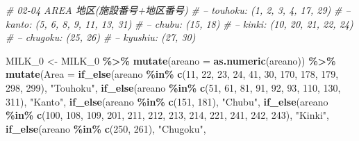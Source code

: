 \documentclass[
]{article}
\newenvironment{Shaded}{\begin{snugshade}}{\end{snugshade}}
\newcommand{\CommentTok}[1]{\textcolor[rgb]{0.56,0.35,0.01}{\textit{#1}}}
\newcommand{\DataTypeTok}[1]{\textcolor[rgb]{0.13,0.29,0.53}{#1}}
\newcommand{\DecValTok}[1]{\textcolor[rgb]{0.00,0.00,0.81}{#1}}
\newcommand{\KeywordTok}[1]{\textcolor[rgb]{0.13,0.29,0.53}{\textbf{#1}}}
\newcommand{\NormalTok}[1]{#1}
\newcommand{\OperatorTok}[1]{\textcolor[rgb]{0.81,0.36,0.00}{\textbf{#1}}}
\newcommand{\StringTok}[1]{\textcolor[rgb]{0.31,0.60,0.02}{#1}}
\begin{document}
\begin{Shaded}
\begin{Highlighting}[]
\CommentTok{\# 02{-}04 AREA 地区(施設番号+地区番号)}
\CommentTok{\# – touhoku: (1, 2, 3, 4, 17, 29)}
\CommentTok{\# – kanto: (5, 6, 8, 9, 11, 13, 31)}
\CommentTok{\# – chubu: (15, 18)}
\CommentTok{\# – kinki: (10, 20, 21, 22, 24)}
\CommentTok{\# – chugoku: (25, 26)}
\CommentTok{\# – kyushiu: (27, 30)}

\NormalTok{MILK\_}\DecValTok{0}\NormalTok{ \textless{}{-}}\StringTok{ }\NormalTok{MILK\_}\DecValTok{0} \OperatorTok{\%\textgreater{}\%}\StringTok{ }
\StringTok{  }\KeywordTok{mutate}\NormalTok{(}\DataTypeTok{areano =} \KeywordTok{as.numeric}\NormalTok{(areano)) }\OperatorTok{\%\textgreater{}\%}\StringTok{ }
\StringTok{  }\KeywordTok{mutate}\NormalTok{(}\DataTypeTok{Area =} \KeywordTok{if\_else}\NormalTok{(areano }\OperatorTok{\%in\%}\StringTok{ }\KeywordTok{c}\NormalTok{(}\DecValTok{11}\NormalTok{, }\DecValTok{22}\NormalTok{, }\DecValTok{23}\NormalTok{, }\DecValTok{24}\NormalTok{, }\DecValTok{41}\NormalTok{, }\DecValTok{30}\NormalTok{,}
                                      \DecValTok{170}\NormalTok{, }\DecValTok{178}\NormalTok{, }\DecValTok{179}\NormalTok{, }\DecValTok{298}\NormalTok{, }\DecValTok{299}\NormalTok{), }\StringTok{"Touhoku"}\NormalTok{, }
                  \KeywordTok{if\_else}\NormalTok{(areano }\OperatorTok{\%in\%}\StringTok{ }\KeywordTok{c}\NormalTok{(}\DecValTok{51}\NormalTok{, }\DecValTok{61}\NormalTok{, }\DecValTok{81}\NormalTok{, }\DecValTok{91}\NormalTok{, }\DecValTok{92}\NormalTok{, }\DecValTok{93}\NormalTok{, }
                                          \DecValTok{110}\NormalTok{, }\DecValTok{130}\NormalTok{, }\DecValTok{311}\NormalTok{), }\StringTok{"Kanto"}\NormalTok{, }
                    \KeywordTok{if\_else}\NormalTok{(areano }\OperatorTok{\%in\%}\StringTok{ }\KeywordTok{c}\NormalTok{(}\DecValTok{151}\NormalTok{, }\DecValTok{181}\NormalTok{), }\StringTok{"Chubu"}\NormalTok{, }
                      \KeywordTok{if\_else}\NormalTok{(areano }\OperatorTok{\%in\%}\StringTok{ }\KeywordTok{c}\NormalTok{(}\DecValTok{100}\NormalTok{, }\DecValTok{108}\NormalTok{, }\DecValTok{109}\NormalTok{, }\DecValTok{201}\NormalTok{, }\DecValTok{211}\NormalTok{, }\DecValTok{212}\NormalTok{, }\DecValTok{213}\NormalTok{, }
                                \DecValTok{214}\NormalTok{, }\DecValTok{221}\NormalTok{, }\DecValTok{241}\NormalTok{, }\DecValTok{242}\NormalTok{, }\DecValTok{243}\NormalTok{), }\StringTok{"Kinki"}\NormalTok{, }
                        \KeywordTok{if\_else}\NormalTok{(areano }\OperatorTok{\%in\%}\StringTok{ }\KeywordTok{c}\NormalTok{(}\DecValTok{250}\NormalTok{, }\DecValTok{261}\NormalTok{), }\StringTok{"Chugoku"}\NormalTok{, }

\end{Highlighting}
\end{Shaded}
\end{document}
